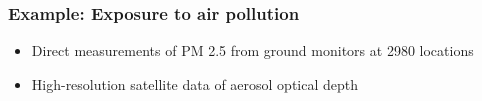 \documentclass[10pt,handout]{beamer}
\begin{document}
\begin{frame}

\frametitle{Example: Exposure to air pollution}

  \begin{itemize}
  \item Direct measurements of PM 2.5 from ground monitors at 2980
    locations
  \item High-resolution satellite data of aerosol optical depth
  \end{itemize}
  \begin{center}
\end{center}
\end{frame}
\end{document}
